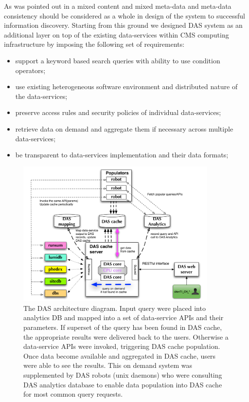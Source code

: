 \documentclass[1p,times]{elsarticle}
\begin{document}
As was pointed out in \cite{Arms} a mixed content and 
mixed meta-data and meta-data consistency should be considered as a whole in design 
of the system to successful information discovery. 
Starting from this ground we designed DAS system as an
additional layer on top of the existing data-services
within CMS computing infrastructure by imposing the following set of requirements:
\begin{itemize}
\item support a keyword based search queries with ability to use condition operators;
\item use existing heterogeneous software environment and distributed nature of the data-services;
\item preserve access rules and security policies of individual data-services;
\item retrieve data on demand and aggregate them if necessary across
multiple data-services;
\item be transparent to data-services implementation and their data formats;
\end{itemize}
\begin{figure}[htb]
\centering
\includegraphics[width=100mm]{DAS_Cache_and_Analytics.pdf}
\caption{
The DAS architecture diagram. 
Input query were placed into analytics DB and mapped into a set of
data-service APIs and their parameters. If superset of the query has been
found in DAS cache, the appropriate results were delivered back to the users.
Otherwise a data-service APIs were invoked, triggering DAS cache population. 
Once data become available and aggregated in DAS cache, users were able 
to see the results. This on demand system was supplemented by DAS robots 
(unix daemons) who were consulting DAS analytics database to enable data 
population into DAS cache for most common query requests.
}
\label{DAS_cache}
\end{figure}
\end{document}
